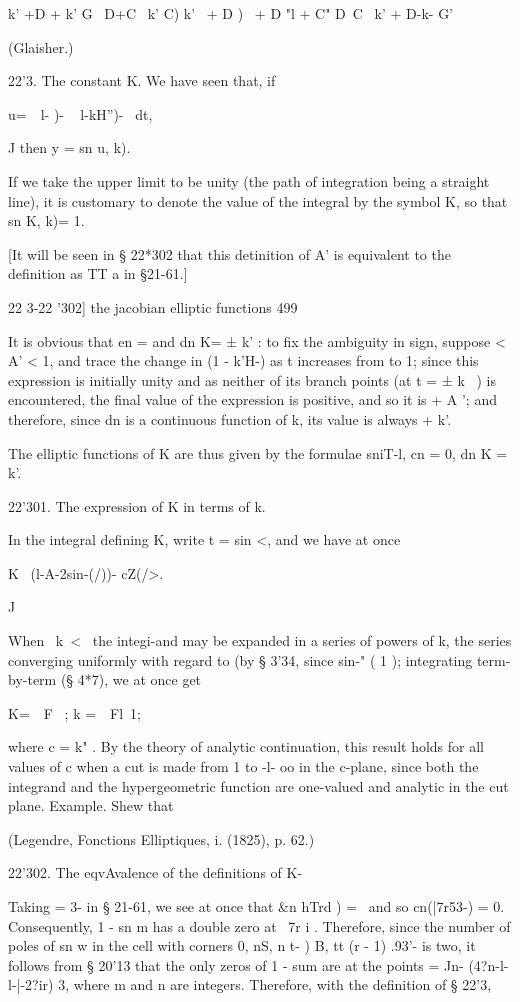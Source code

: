 k' +D + k' G \ D+C \ k' C) k' \ + D ) \ + D "l + C" D~C ~k' + D-k- G'

(Glaisher.)

22'3. The constant K. We have seen that, if

u=\ \ l- )- ~ l-kH'')- ~dt,

J then y = sn u, k).

If we take the upper limit to be unity (the path of integration being
a straight line), it is customary to denote the value of the integral
by the symbol K, so that sn K, k)= 1.

[It will be seen in § 22*302 that this detinition of A' is equivalent
to the definition as TT a in §21-61.]

22 3-22 '302] the jacobian elliptic functions 499

It is obvious that en = and dn K= ± k' : to fix the ambiguity in sign,
suppose < A' < 1, and trace the change in (1 - k'H-) as t increases
from to 1; since this expression is initially unity and as neither of
its branch points (at t = ± k~ ) is encountered, the final value of
the expression is positive, and so it is + A '; and therefore, since
dn is a continuous function of k, its value is always + k'.

The elliptic functions of K are thus given by the formulae sniT-l, cn
= 0, dn K = k'.

22'301. The expression of K in terms of k.

In the integral defining K, write t = sin <, and we have at once

K \ (l-A-2sin-(/))- cZ(/>.

J

When \ k\ < \, the integi-and may be expanded in a series of powers of
k, the series converging uniformly with regard to (by § 3'34, since
sin-" ( 1 ); integrating term-by-term (§ 4*7), we at once get

K=\ \ F \, ; k =\ \ Fl\, 1;

where c = k" . By the theory of analytic continuation, this result
holds for all values of c when a cut is made from 1 to -l- oo in the
c-plane, since both the integrand and the hypergeometric function are
one-valued and analytic in the cut plane. Example. Shew that

(Legendre, Fonctions Elliptiques, i. (1825), p. 62.)

22'302. The eqvAvalence of the definitions of K-

Taking = 3- in § 21-61, we see at once that \&n hTrd ) = \ and so
cn(|7r53-) = 0. Consequently, 1 - sn m has a double zero at \ 7r i .
Therefore, since the number of poles of sn w in the cell with corners
0, nS, n t- ) B, tt (r - 1) .93'- is two, it follows from § 20'13
that the only zeros of 1 - sum are at the points = Jn-
(4?n-l-l-|-2?ir) 3, where m and n are integers. Therefore, with the
definition of § 22'3,

